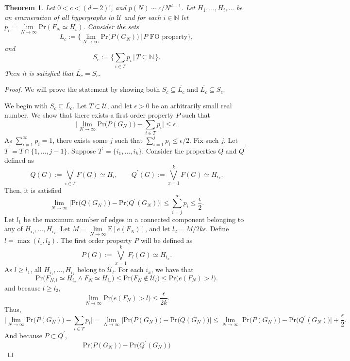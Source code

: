 \documentclass[11pt,notitlepage,a4paper]{article}
\newtheorem{theorem}{Theorem}[section]
\theoremstyle{definition}
\newcommand{\N}{\mathbb{N}}
\newcommand{\LN}{\lim\limits_{N\to \infty}}
\begin{document}
\begin{theorem}
	Let $0<c<(d-2)!$, and $p(N)\sim c/N^{d-1}$. Let 
	$H_1,\dots, H_i,\dots$ be an enumeration of all
	hypergraphs in $\mathcal{U}$ and for each $i\in \N$ 
	let $p_i=\LN \mathrm{Pr}(F_N\simeq H_i)$. 
	Consider the sets 
	\[
	L_c:=\{
	\LN \mathrm{Pr}\big(P(G_N)\big) \, | \,
	P \text{ FO property} \},
	\] 
	and 
	\[
	S_c:=\{
	\sum_{i\in T} p_i \, | \, T \subseteq \N \,
	\}.	
	\]
	Then it is satisfied that $\overline{L_c}=S_c$. 		
\end{theorem}
\begin{proof}
	We will prove the statement by showing both 
	$S_c\subseteq \overline{L_c}$ and
	$\overline{L_c}\subseteq S_c$. \par 
	We begin with 
	$S_c\subseteq \overline{L_c}$. 
	Let $T\subset \mathcal{U}$, and let $\epsilon>0$ be
	an arbitrarily small real number. We show that 
	there exists a first order property $P$ such that
	\[ \Big| \LN \mathrm{Pr}\big( P(G_N)\big) 
	- \sum_{i\in T} p_i \Big| \leq \epsilon. \]
	As $\sum_{i=1}^{\infty} p_i=1$, there exists some $j$ such that
	$\sum_{i=1}^j p_i \leq \epsilon/2$. Fix such $j$. Let
	$T^\prime= T \cap \{ 1,\dots,j-1\}$. Suppose
	$T^\prime=\{i_1,\dots,i_k\}$. 
	Consider the properties $Q$ and $Q^\prime$ defined as
	\[
	Q(G):= \bigvee_{i\in T} F(G)\simeq H_i,  \qquad
	Q^\prime(G):= \bigvee_{x=1}^k F(G)\simeq H_{i_x}.
	\]
	Then, it is satisfied  
	\[
	\LN \Big| \mathrm{Pr}\big( Q(G_N) \big)
	- \mathrm{Pr}\big( Q^\prime(G_N) 
	\big)\Big| \leq \sum_{i=j}^\infty p_i \leq \frac{\epsilon}{2}.
	\]
	Let $l_1$ be 
	the maximum number of edges in a connected component belonging
	to any of $H_{i_1},\dots,H_{i_k}$. Let 
	$M=\LN \mathrm{E}[e(F_N)]$, and let $l_2=M/2k\epsilon$.
	Define $l=\max(l_1,l_2)$. 
	The first order property $P$ will be defined as 
	\[
	P(G):=\bigvee_{x=1}^k F_l(G)\simeq H_{i_x}.
	\]
	As $l\geq l_1$, all
	$H_{i_1},\dots, H_{i_k}$ belong to $\mathcal{U}_l$.
	For each $i_x$, we have that
	\[ \mathrm{Pr}\big(F_{N,l}\simeq H_{i_x} \wedge 
	F_N\simeq H_{i_x} \big)\leq
	\mathrm{Pr}\big(F_N\notin \mathcal{U}_l\big) \leq 
	\mathrm{Pr}\big(e(F_N)>l\big).
	\]
	and because $l\geq l_2$,
	\[
	\LN \mathrm{Pr}\big(e(F_N)>l\big)
	\leq \frac{\epsilon}{2k}.
	\]
	Thus,
	\[
	\big|\LN \mathrm{Pr}\big(P(G_N)\big)- \sum_{i\in T}p_i \big|
	= \LN \big|\mathrm{Pr}\big(P(G_N)\big) -
	\mathrm{Pr}\big(Q(G_N)\big)\big|	\leq
	\LN	\big| \mathrm{Pr}\big(P(G_N)\big) -
	\mathrm{Pr}\big(Q^\prime(G_N)\big)\big|
	+ \frac{\epsilon}{2}.
	\]
	And because $P\subset Q^\prime$, 
	\[
	\mathrm{Pr}\big(P(G_N)\big) -
	\mathrm{Pr}\big(Q^\prime(G_N)\big)
\]
\end{proof}
\end{document}
